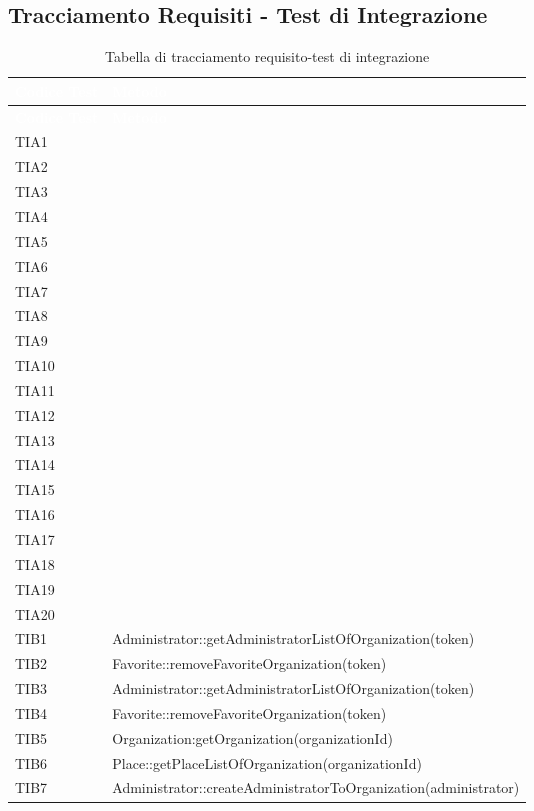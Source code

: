 \subsection{Tracciamento Requisiti - Test di Integrazione}
{
	\renewcommand{\arraystretch}{1.5}
	\centering
	\begin{longtable}{C{2cm} C{12cm}}
	\caption{Tabella di tracciamento requisito-test di integrazione}\\
	\textcolor{white}{\textbf{Codice Test}} & \textcolor{white}{\textbf{Metodo}}\\	
	\endfirsthead
	\textcolor{white}{\textbf{Codice Test}} & \textcolor{white}{\textbf{Metodo}}\\	
	\endhead
	
	TIA1 &  \\
	TIA2 &  \\
	TIA3 &  \\
	TIA4 &  \\
	TIA5 &  \\
	TIA6 &  \\
	TIA7 &  \\
	TIA8 &  \\
	TIA9 &  \\
	TIA10 &  \\
	TIA11 &  \\
	TIA12 &  \\
	TIA13 &  \\
	TIA14 &  \\
	TIA15 &  \\
	TIA16 &  \\
	TIA17 &  \\
	TIA18 &  \\
	TIA19 &  \\
	TIA20 &  \\
	TIB1 & Administrator::getAdministratorListOfOrganization(token) \\
	TIB2 & Favorite::removeFavoriteOrganization(token)  \\
	TIB3 & Administrator::getAdministratorListOfOrganization(token)  \\
	TIB4 & Favorite::removeFavoriteOrganization(token) \\
	TIB5 & Organization:getOrganization(organizationId) \\
	TIB6 & Place::getPlaceListOfOrganization(organizationId) \\
	TIB7 & Administrator::createAdministratorToOrganization(administrator) \\

\end{longtable}}
